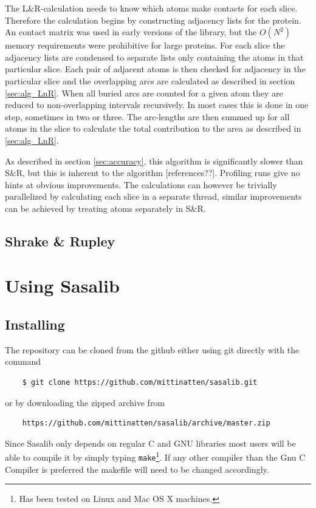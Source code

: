 \documentclass[a4paper,11pt]{article}
\begin{document}
The L\&R-calculation needs to know which atoms make contacts for each
slice. Therefore the calculation begins by constructing adjacency
lists for the protein. An contact matrix was used in early versions of
the library, but the $O(N^2)$ memory requirements were prohibitive for
large proteins. For each slice the adjacency lists are condensed to
separate lists only containing the atoms in that particular
slice. Each pair of adjacent atoms is then checked for adjacency in
the particular slice and the overlapping arcs are calculated as
described in section \ref{sec:alg_LnR}. When all buried arcs are
counted for a given atom they are reduced to non-overlapping intervals
recursively. In most cases this is done in one step, sometimes in two
or three. The arc-lengths are then summed up for all atoms in the
slice to calculate the total contribution to the area as described in
\ref{sec:alg_LnR}.

As described in section \ref{sec:accuracy}, this algorithm is
significantly slower than S\&R, but this is inherent to the algorithm
[references??]. Profiling runs give no hints at obvious
improvements. The calculations can however be trivially parallelized
by calculating each slice in a separate thread, similar improvements
can be achieved by treating atoms separately in S\&R.

\subsection{Shrake \& Rupley}



\section{Using Sasalib} \label{sec:using}

\subsection{Installing}

The repository can be cloned from the github either using git directly
with the command
\begin{verbatim}
    $ git clone https://github.com/mittinatten/sasalib.git
\end{verbatim}
or by downloading the zipped archive from
\begin{verbatim}
    https://github.com/mittinatten/sasalib/archive/master.zip
\end{verbatim}
Since Sasalib only depends on regular C and GNU libraries most users
will be able to compile it by simply typing \texttt{make}\footnote{Has
  been tested on Linux and Mac OS X machines.}. If any other compiler
than the Gnu C Compiler is preferred the makefile will need to be
changed accordingly.
\end{document}
